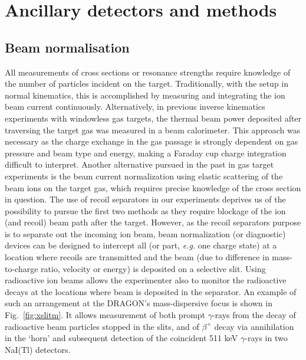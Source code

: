 \section{Ancillary detectors and methods}

\subsection{Beam normalisation}

All measurements of cross sections or resonance strengths require knowledge of the number of particles incident on the target. Traditionally, with the setup in normal kinematics, this is accomplished by measuring and integrating the ion beam current continuously. Alternatively, in previous inverse kinematics experiments with windowless gas targets, the thermal beam power deposited after traversing the target gas was measured in a beam calorimeter. This approach was necessary as the charge exchange in the gas passage is strongly dependent on gas pressure and beam type and energy, making a Faraday cup charge integration difficult to interpret. Another alternative pursued in the past in gas target experiments is the beam current normalization using elastic scattering of the beam ions on the target gas, which requires precise knowledge of the cross section in question. The use of recoil separators in our experiments deprives us of the possibility to pursue the first two methods as they require blockage of the ion (and recoil) beam path after the target. However, as the recoil separators purpose is to separate out the incoming ion beam, beam normalization (or diagnostic) devices can be designed to intercept all (or part, {\it e.g.} one charge state) at a location where recoils are transmitted and the beam (due to difference in mass-to-charge ratio, velocity or energy) is deposited on a selective slit. Using radioactive ion beams allows the experimenter also to monitor the radioactive decays at the locations where beam is deposited in the separator. An example of such an arrangement at the DRAGON's mass-dispersive focus is shown in Fig.\ \ref{fig:xslitm}. It allows measurement of both prompt $\gamma$-rays from the decay of radioactive beam particles stopped in the slits, and of $\beta^+$ decay via annihilation in the `horn' and subsequent detection of the coincident 511 keV $\gamma$-rays in two NaI(Tl) detectors. 
%
